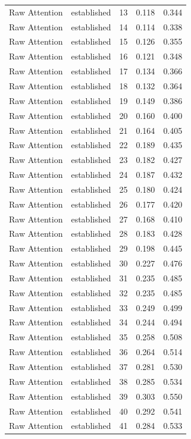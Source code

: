 \begin{tabular}{llrrr}
Raw Attention & established & 13 & 0.118 & 0.344 \\
Raw Attention & established & 14 & 0.114 & 0.338 \\
Raw Attention & established & 15 & 0.126 & 0.355 \\
Raw Attention & established & 16 & 0.121 & 0.348 \\
Raw Attention & established & 17 & 0.134 & 0.366 \\
Raw Attention & established & 18 & 0.132 & 0.364 \\
Raw Attention & established & 19 & 0.149 & 0.386 \\
Raw Attention & established & 20 & 0.160 & 0.400 \\
Raw Attention & established & 21 & 0.164 & 0.405 \\
Raw Attention & established & 22 & 0.189 & 0.435 \\
Raw Attention & established & 23 & 0.182 & 0.427 \\
Raw Attention & established & 24 & 0.187 & 0.432 \\
Raw Attention & established & 25 & 0.180 & 0.424 \\
Raw Attention & established & 26 & 0.177 & 0.420 \\
Raw Attention & established & 27 & 0.168 & 0.410 \\
Raw Attention & established & 28 & 0.183 & 0.428 \\
Raw Attention & established & 29 & 0.198 & 0.445 \\
Raw Attention & established & 30 & 0.227 & 0.476 \\
Raw Attention & established & 31 & 0.235 & 0.485 \\
Raw Attention & established & 32 & 0.235 & 0.485 \\
Raw Attention & established & 33 & 0.249 & 0.499 \\
Raw Attention & established & 34 & 0.244 & 0.494 \\
Raw Attention & established & 35 & 0.258 & 0.508 \\
Raw Attention & established & 36 & 0.264 & 0.514 \\
Raw Attention & established & 37 & 0.281 & 0.530 \\
Raw Attention & established & 38 & 0.285 & 0.534 \\
Raw Attention & established & 39 & 0.303 & 0.550 \\
Raw Attention & established & 40 & 0.292 & 0.541 \\
Raw Attention & established & 41 & 0.284 & 0.533 \\

\end{tabular}

